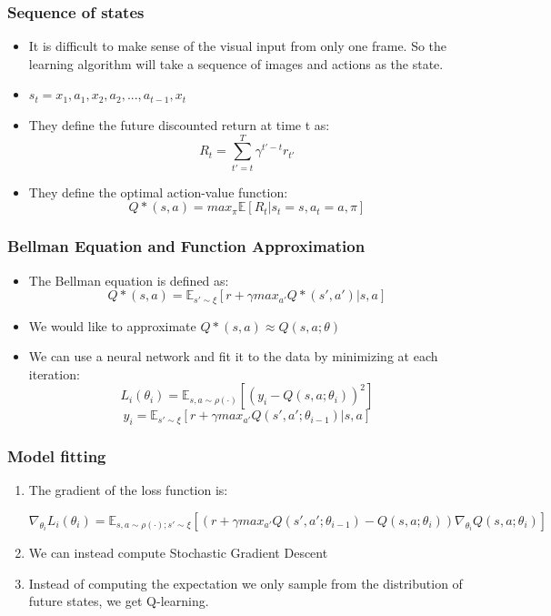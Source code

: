 \documentclass[12pt]{beamer}
\begin{document}
\begin{frame}
\frametitle{Sequence of states}
\begin{itemize}
\item It is difficult to make sense of the visual input from only one frame. So the learning algorithm will take a sequence of images and actions as the state.
\item $s_t=x_1,a_1,x_2,a_2,...,a_{t-1},x_t$
\item They define the future discounted return at time t as: $$R_t = \sum\limits_{t'=t}^T\gamma^{t'-t}r_{t'}$$
\item They define the optimal action-value function:
$$Q*(s,a) = max_{\pi}\mathbb{E}[R_t|s_t=s,a_t=a,\pi]$$
\end{itemize}
\end{frame}


\begin{frame}
\frametitle{Bellman Equation and Function Approximation}
\begin{itemize}
\item The Bellman equation is defined as:
$$Q*(s,a) = \mathbb{E}_{s'\sim \xi}[r+\gamma max_{a'}Q*(s',a')|s,a]$$
\item We would like to approximate $Q*(s,a)\approx Q(s,a;\theta)$
\item We can use a neural network and fit it to the data by minimizing at each iteration:$$L_i(\theta_i) = \mathbb{E}_{s,a \sim \rho(\cdot)}[(y_i-Q(s,a;\theta_i))^2]$$
$$y_i = \mathbb{E}_{s'\sim \xi} [r+\gamma max_{a'}Q(s',a';\theta_{i-1})|s,a]$$
\end{itemize}
\end{frame}

\begin{frame}
\frametitle{Model fitting}
\begin{enumerate}
\item The gradient of the loss function is:
\begin{scriptsize}
$$\nabla_{\theta_i}L_i(\theta_i) = \mathbb{E}_{s,a\sim \rho(\cdot);s'\sim \xi} \left[\left(r+\gamma max_{a'}Q(s',a';\theta_{i-1}) - Q(s,a;\theta_i)\right)\nabla_{\theta_i}Q(s,a;\theta_i)\right]$$
\end{scriptsize}
\item We can instead compute Stochastic Gradient Descent
\item Instead of computing the expectation we only sample from the distribution of future states, we get Q-learning.
\end{enumerate}
\end{frame}
\end{document}

